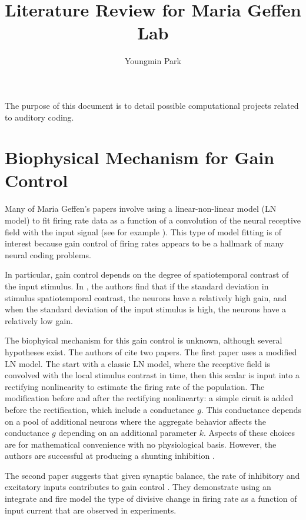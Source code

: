 \documentclass[a4paper,12pt]{article}
\title{Literature Review for Maria Geffen Lab}
\author{Youngmin Park}
\begin{document}
\maketitle
\tableofcontents

The purpose of this document is to detail possible computational projects related to auditory coding.

\section{Biophysical Mechanism for Gain Control}
Many of Maria Geffen's papers involve using a linear-non-linear model (LN model) to fit firing rate data as a function of a convolution of the neural receptive field with the input signal (see for example \cite{natan2016gain}). This type of model fitting is of interest because gain control of firing rates appears to be a hallmark of many neural coding problems.

In particular, gain control depends on the degree of spatiotemporal contrast of the input stimulus. In \cite{rabinowitz2011contrast}, the authors find that if the standard deviation in stimulus spatiotemporal contrast, the neurons have a relatively high gain, and when the standard deviation of the input stimulus is high, the neurons have a relatively low gain.

The biophyical mechanism for this gain control is unknown, although several hypotheses exist. The authors of \cite{rabinowitz2011contrast} cite two papers. The first paper uses a modified LN model. The start with a classic LN model, where the receptive field is convolved with the local stimulus contrast in time, then this scalar is input into a rectifying nonlinearity to estimate the firing rate of the population. The modification before and after the rectifying nonlinearty: a simple ciruit is added before the rectification, which include a conductance $g$. This conductance depends on a pool of additional neurons where the aggregate behavior affects the conductance $g$ depending on an additional parameter $k$. Aspects of these choices are for mathematical convenience with no physiological basis. However, the authors are successful at producing a shunting inhibition \cite{carandini1997linearity}.

The second paper suggests that given synaptic balance, the rate of inhibitory and excitatory inputs contributes to gain control \cite{abbott2005drivers}. They demonstrate using an integrate and fire model the type of divisive change in firing rate as a function of input current that are observed in experiments.
\end{document}
